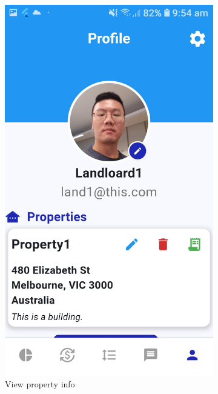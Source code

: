\documentclass[sigconf]{acmart}
\begin{document}
\begin{figure}[h]
  \centering
  \begin{subfigure}{0.24\textwidth}
    \includegraphics[width=\textwidth]{propertyInfo.jpg}
    \caption{View property info}
    \label{fig:propertyInfo}
  \end{subfigure}
  \begin{subfigure}{0.24\textwidth}

\end{subfigure}
\end{figure}
\end{document}
